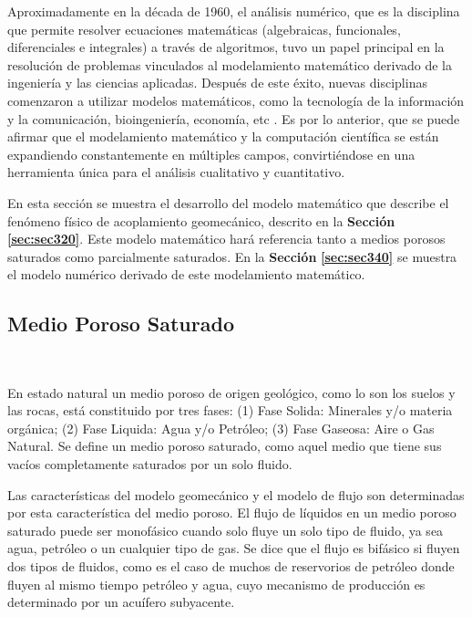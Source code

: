 Aproximadamente en la década de 1960, el análisis numérico, que es la disciplina que permite resolver ecuaciones matemáticas (algebraicas, funcionales, diferenciales e integrales) a través de algoritmos, tuvo un papel principal en la resolución de problemas vinculados al modelamiento matemático derivado de la ingeniería y las ciencias aplicadas. Después de este éxito, nuevas disciplinas comenzaron a utilizar modelos matemáticos, como la tecnología de la información y la comunicación, bioingeniería, economía, etc \cite{Quarteroni2009MathematicalEngineering}. Es por lo anterior, que se puede afirmar que el modelamiento matemático y la computación científica se están expandiendo constantemente en múltiples campos, convirtiéndose en una herramienta única para el análisis cualitativo y cuantitativo.\bigskip

En esta sección se muestra el desarrollo del modelo matemático que describe el fenómeno físico de acoplamiento geomecánico, descrito en la \textbf{Sección} \textbf{\ref{sec:sec320}}. Este modelo matemático hará referencia tanto a medios porosos saturados como parcialmente saturados. En la \textbf{Sección} \textbf{\ref{sec:sec340}} se muestra el modelo numérico derivado de este modelamiento matemático.

\subsection{Medio Poroso Saturado}~\hypertarget{sec:sec331}{}
\label{sec:sec331}

En estado natural un medio poroso de origen geológico, como lo son los suelos y las rocas, está constituido por tres fases: (1) Fase Solida: Minerales y/o materia orgánica; (2) Fase Liquida: Agua y/o Petróleo; (3) Fase Gaseosa: Aire o Gas Natural. Se define un medio poroso saturado, como aquel medio que tiene sus vacíos completamente saturados por un solo fluido.\bigskip

Las características del modelo geomecánico y el modelo de flujo son determinadas por esta característica del medio poroso. El flujo de líquidos en un medio poroso saturado puede ser monofásico cuando solo fluye un solo tipo de fluido, ya sea agua, petróleo o un cualquier tipo de gas. Se dice que el flujo es bifásico si fluyen dos tipos de fluidos, como es el caso de muchos de reservorios de petróleo donde fluyen al mismo tiempo petróleo y agua, cuyo mecanismo de producción es determinado por un acuífero subyacente.\bigskip

